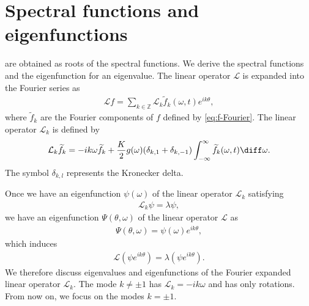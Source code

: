 \section{Spectral functions and eigenfunctions}
\label{sec:spectral-functions}
  are obtained as roots of the spectral functions.
  We derive the spectral functions and the eigenfunction for an eigenvalue.
The linear operator $\mathcal{L}$ is expanded into the Fourier series as
\begin{align}
  \mathcal{L}f = \sum_{k\in\mathbb{Z}} \mathcal{L}_{k}\widetilde{f}_{k}(\omega,t) e^{ik\theta},
\end{align}
where $\widetilde{f}_{k}$ are the Fourier components of $f$ defined by
\eqref{eq:f-Fourier}.
The linear operator $\mathcal{L}_{k}$ is defined by
\begin{align}
  \label{eq:Lk}
  \mathcal{L}_{k} \widetilde{f}_{k}
  = -ik\omega \widetilde{f}_{k}
  + \frac{K}{2} g(\omega) ( \delta_{k,1} + \delta_{k,-1} )
  \int_{-\infty}^{\infty} \widetilde{f}_{k}(\omega,t) \diff\omega.
\end{align}
The symbol $\delta_{k,l}$ represents the Kronecker delta.

Once we have an eigenfunction $\psi(\omega)$ of the linear operator
$\mathcal{L}_{k}$ satisfying
\begin{align}
  \mathcal{L}_{k}\psi = \lambda \psi,
  \label{eq:eigenfunction-psi}
\end{align}
we have an eigenfunction $\Psi(\theta,\omega)$
of the linear operator $\mathcal{L}$ as
\begin{align}
  \Psi(\theta,\omega) = \psi(\omega)e^{ik\theta},
  \label{eq:Psi}
\end{align}
which induces
\begin{align}
  \mathcal{L}(\psi e^{ik\theta}) = \lambda (\psi e^{ik\theta}).
\end{align}
We therefore discuss eigenvalues and eigenfunctions
of the Fourier expanded linear operator $\mathcal{L}_{k}$.
The mode $k\neq\pm 1$ has $\mathcal{L}_{k}=-ik\omega$
and has only rotations. From now on, we focus on the modes $k=\pm 1$.

